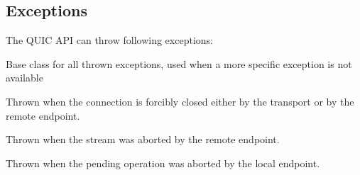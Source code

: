 \subsection{Exceptions}

The QUIC API can throw following exceptions:

\begin{description}

     Base class for all thrown exceptions, used when a more specific exception is not available

     Thrown when the connection is forcibly closed either by the transport or by the remote endpoint.

     Thrown when the stream was aborted by the remote endpoint.

     Thrown when the pending operation was aborted by the local endpoint.

\end{description}
